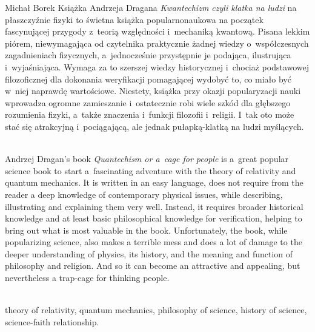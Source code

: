 \begin{newrevplenv}{Michał Borek}
Książka Andrzeja Dragana \textit{Kwantechizm czyli klatka na ludzi} na płaszczyźnie fizyki to świetna książka popularnonaukowa na początek fascynującej przygody z~teorią względności i~mechaniką kwantową. Pisana lekkim piórem, niewymagająca od czytelnika praktycznie żadnej wiedzy o~współczesnych zagadnieniach fizycznych, a~jednocześnie przystępnie je podająca, ilustrująca i~wyjaśniająca. Wymaga za to szerszej wiedzy historycznej i~chociaż podstawowej filozoficznej dla dokonania weryfikacji pomagającej wydobyć to, co miało być w~niej naprawdę wartościowe. Niestety, książka przy okazji popularyzacji nauki wprowadza ogromne zamieszanie i~ostatecznie robi wiele szkód dla głębszego rozumienia fizyki, a~także znaczenia i~funkcji filozofii i~religii. I~tak oto może stać się atrakcyjną i~pociągającą, ale jednak pułapką-klatką na ludzi myślących.





\vspace{5mm}%
\begin{flushright}
{\chaptitleeng\color{black!50}{A cage for thinking people}}
\end{flushright}

{}\\
{Andrzej Dragan's book \textit{Quantechism or a~cage for people} is a~great popular science book to start a~fascinating adventure with the theory of relativity and quantum mechanics. It is written in an easy language, does not require from the reader a deep knowledge of contemporary physical issues, while describing, illustrating and explaining them very well. Instead, it requires broader historical knowledge and at least basic philosophical knowledge for verification, helping to bring out what is most valuable in the book. Unfortunately, the book, while popularizing science, also makes a terrible mess and does a lot of damage to the deeper understanding of physics, its history, and the meaning and function of philosophy and religion. And so it can become an attractive and appealing, but nevertheless a trap-cage for thinking people.}\par%
\vspace{2mm}%
{}\\%
{theory of relativity, quantum mechanics, philosophy of science, history of science, science-faith relationship.}%


\end{newrevplenv}

